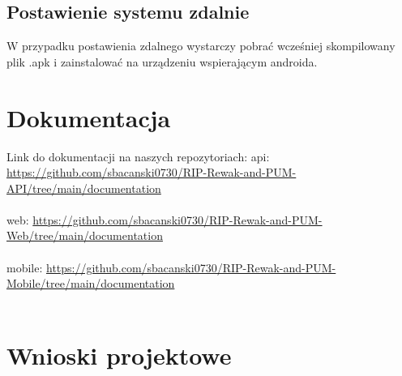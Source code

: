 \documentclass{article}
\begin{document}
\subsection{Postawienie systemu zdalnie}
W przypadku postawienia zdalnego wystarczy pobrać wcześniej skompilowany plik .apk i zainstalować na urządzeniu wspierającym androida. 


\section{Dokumentacja}
Link do dokumentacji na naszych repozytoriach: 
api: \url{https://github.com/sbacanski0730/RIP-Rewak-and-PUM-API/tree/main/documentation}\\\\
web: \url{https://github.com/sbacanski0730/RIP-Rewak-and-PUM-Web/tree/main/documentation}\\\\
mobile: \url{https://github.com/sbacanski0730/RIP-Rewak-and-PUM-Mobile/tree/main/documentation}\\\\

\section{Wnioski projektowe}
\end{document}
